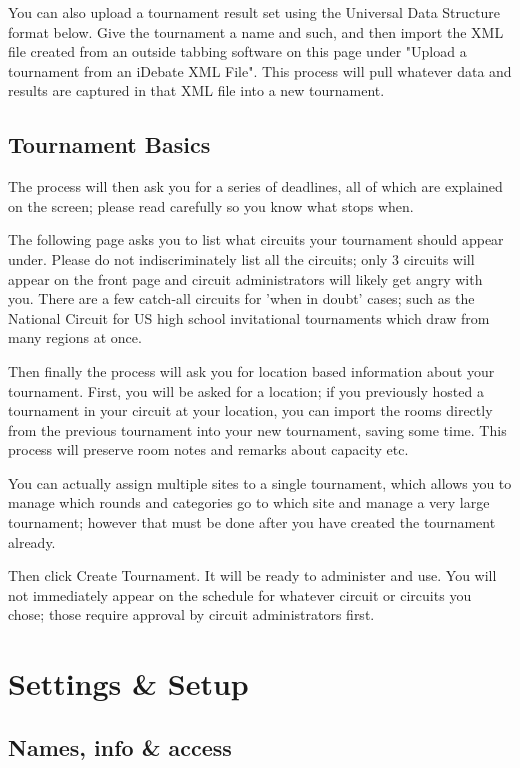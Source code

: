 \documentclass[12pt]{report}
\begin{document}
		You can also upload a tournament result set using the Universal Data
		Structure format below.  Give the tournament a name and such, and then
		import the XML file created from an outside tabbing software on this
		page under "Upload a tournament from an iDebate XML File".  This
		process will pull whatever data and results are captured in that XML
		file into a new tournament.

	\section{Tournament Basics} 

		The process will then ask you for a series of deadlines, all of which
		are explained on the screen; please read carefully so you know what
		stops when.  
		
		The following page asks you to list what circuits your tournament
		should appear under.  Please do not indiscriminately list all the
		circuits; only 3 circuits will appear on the front page and circuit
		administrators will likely get angry with you.   There are a few
		catch-all circuits for 'when in doubt' cases; such as the National
		Circuit for US high school invitational tournaments which draw from
		many regions at once.

		Then finally the process will ask you for location based information
		about your tournament.  First, you will be asked for a location; if you
		previously hosted a tournament in your circuit at your location, you
		can import the rooms directly from the previous tournament into your
		new tournament, saving some time.  This process will preserve room
		notes and remarks about capacity etc.

		You can actually assign multiple sites to a single tournament, which
		allows you to manage which rounds and categories go to which site and
		manage a very large tournament; however that must be done after you
		have created the tournament already.

		Then click Create Tournament.  It will be ready to administer and use.
		You will not immediately appear on the schedule for whatever circuit or
		circuits you chose; those require approval by circuit administrators
		first.

\chapter{Settings \& Setup}

	\section{Names, info \& access}
\end{document}
